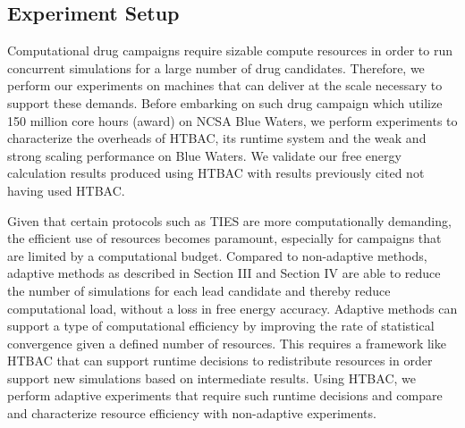 \subsection{Experiment Setup}\label{ssec:exp_design}

Computational drug campaigns require sizable compute resources in order to
run concurrent simulations for a large number of drug candidates. Therefore,
we perform our experiments on machines that can deliver at the scale
necessary to support these demands.  Before embarking on such drug campaign which utilize 150 million
core hours (award) on NCSA Blue Waters, we perform experiments to
characterize the overheads of HTBAC, its runtime system and the weak and
strong scaling performance on Blue Waters. We validate our free energy
calculation results produced using HTBAC with results previously cited not
having used HTBAC.

Given that certain protocols such as TIES are more computationally demanding,
the efficient use of resources becomes paramount, especially for campaigns
that are limited by a computational budget. Compared to non-adaptive methods,
adaptive methods as described in Section III and Section IV are able to
reduce the number of simulations for each lead candidate and thereby reduce
computational load, without a loss in free energy accuracy. Adaptive methods
can support a type of computational efficiency by improving the rate of
statistical convergence given a defined number of resources. This requires a
framework like HTBAC that can support runtime decisions to redistribute
resources in order support new simulations based on intermediate results.
Using HTBAC, we perform adaptive experiments that require such runtime
decisions and compare and characterize resource efficiency with non-adaptive
experiments.




